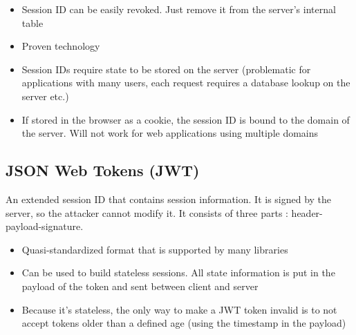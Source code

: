 \begin{minipage}[t]{0.48\textwidth}
    \begin{itemize}
        \item Session ID can be easily revoked. Just remove it from the server’s internal table
        \item Proven technology
    \end{itemize}
\end{minipage}
\hfill
\begin{minipage}[t]{0.48\textwidth}
    \begin{itemize}
        \item Session IDs require state to be stored on the server (problematic for applications with many users, each request requires a database lookup on the server etc.)
        \item If stored in the browser as a cookie, the session ID is bound to the domain of the server. Will not work for web applications using multiple domains
    \end{itemize}
\end{minipage}

\subsection{JSON Web Tokens (JWT)}

An extended session ID that contains session information. It is signed by the server, so the attacker cannot modify it. It consists of three parts : header-payload-signature.

\begin{minipage}[t]{0.48\textwidth}
    \begin{itemize}
        \item Quasi-standardized format that is supported by many libraries
        \item Can be used to build stateless sessions. All state information is put in the payload of the token and sent between client and server
    \end{itemize}
\end{minipage}
\hfill
\begin{minipage}[t]{0.48\textwidth}
    \begin{itemize}
        \item Because it’s stateless, the only way to make a JWT token invalid is to not accept tokens older than a defined age (using the timestamp in the payload)
    \end{itemize}
\end{minipage}

